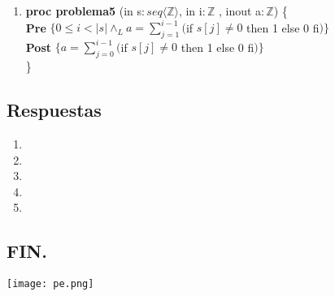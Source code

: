 \documentclass{article}
\begin{document}
\begin{enumerate}[label=\alph*)]
\item \textbf{proc problema5 }(in s$: seq\langle \mathbb{Z}\rangle$, in i$:\mathbb{Z}$
	, inout a$: \mathbb{Z}$) \{\smallskip \\                            
    \hspace*{6mm} \textbf{Pre }$\{0 \leq i < |s| \wedge_L a=\sum_{j=1}^{i-1}($if $s[j] \neq 0$ 
    then 1 else 0 fi$)\}$\smallskip \\          
   \hspace*{6mm} \textbf{Post }$\{a=\sum_{j=0}^{i-1}($if $s[j] \neq 0$ 
    then 1 else 0 fi$)\}$\\
   \}                        
\end{enumerate}

\subsection*{Respuestas}

\begin{enumerate}[label=\alph*)]
	\item
	\item
	\item
	\item
	\item
\end{enumerate}
\begin{center}
\section*{FIN.}
\end{center}

\texttt{[image: pe.png]}
\end{document}
